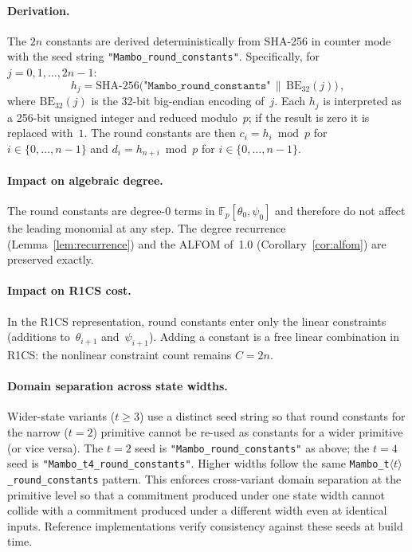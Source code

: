 \documentclass[11pt,a4paper]{article}
\theoremstyle{definition}
\newcommand{\Fp}{\mathbb{F}_p}
\begin{document}
\paragraph{Derivation.}
The $2n$ constants are derived deterministically from SHA-256 in
counter mode with the seed string \texttt{"Mambo\_round\_constants"}.
Specifically, for $j = 0, 1, \ldots, 2n-1$:
\[
  h_j = \mathrm{SHA\text{-}256}\bigl(\texttt{"Mambo\_round\_constants"} \,\|\, \mathrm{BE}_{32}(j)\bigr)\,,
\]
where $\mathrm{BE}_{32}(j)$ is the 32-bit big-endian encoding of~$j$.
Each $h_j$ is interpreted as a 256-bit unsigned integer and reduced
modulo~$p$; if the result is zero it is replaced with~$1$.
The round constants are then
$c_i = h_i \bmod p$ for $i \in \{0, \ldots, n-1\}$ and
$d_i = h_{n+i} \bmod p$ for $i \in \{0, \ldots, n-1\}$.

\paragraph{Impact on algebraic degree.}
The round constants are degree-0 terms in $\Fp[\theta_0, \psi_0]$ and
therefore do not affect the leading monomial at any step. The degree
recurrence (Lemma~\ref{lem:recurrence}) and the ALFOM of~1.0
(Corollary~\ref{cor:alfom}) are preserved exactly.

\paragraph{Impact on R1CS cost.}
In the R1CS representation, round constants enter only the linear
constraints (additions to~$\theta_{i+1}$ and~$\psi_{i+1}$). Adding a
constant is a free linear combination in R1CS: the nonlinear constraint
count remains $C = 2n$.

\paragraph{Domain separation across state widths.}
Wider-state variants ($t \geq 3$) use a distinct seed string so that
round constants for the narrow ($t=2$) primitive cannot be re-used as
constants for a wider primitive (or vice versa). The $t=2$ seed is
\texttt{"Mambo\_round\_constants"} as above; the $t=4$ seed is
\texttt{"Mambo\_t4\_round\_constants"}. Higher widths follow the same
\texttt{Mambo\_t$\langle t\rangle$\_round\_constants} pattern. This
enforces cross-variant domain separation at the primitive level so that
a commitment produced under one state width cannot collide with a
commitment produced under a different width even at identical inputs.
Reference implementations verify consistency against these seeds at
build time.
\end{document}
